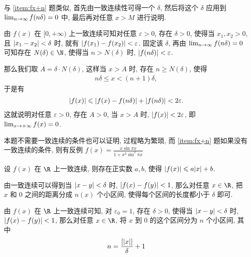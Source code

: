 \begin{exercise}[series=exer]
  \begin{hint}
      与 \ref{item:fx+n} 题类似, 首先由一致连续性可得一个 $ \delta $, 然后将这个 $ \delta $ 应用到 $ \lim_{n \to \infty} f(n\delta) = 0 $ 中, 最后再对任意 $ x > M $ 进行说明.
  \end{hint}
  \begin{answer}
      由 $ f(x) $ 在 $ [0, +\infty) $ 上一致连续可知对任意 $ \varepsilon > 0 $, 存在 $ \delta > 0 $, 使得当 $ x_{1}, x_{2} > 0 $, 且 $ \abs{x_{1} - x_{2}} < \delta $ 时, 就有 $ \abs{f(x_{1}) - f(x_{2})} < \varepsilon $. 固定该 $ \delta $, 再由 $ \lim_{n \to \infty}f(n\delta) = 0 $ 可知存在 $ N(\delta) \in \N $, 使得当 $ n > N(\delta) $ 时, $ \abs{f(n\delta)} < \varepsilon $.

      那么我们取 $ A = \delta \cdot N(\delta) $, 这样当 $ x > A $ 时, 存在 $ n \ge N(\delta) $, 使得
      \begin{align*}
          n\delta \le x < (n + 1)\delta,
      \end{align*}
      于是有
      \begin{align*}
          \abs{f(x)} \leqslant \abs{f(x) - f(n\delta)} + \abs{f(n\delta)} < 2\varepsilon.
      \end{align*}
      这就说明对任意 $ \varepsilon > 0 $, 存在 $ A > 0 $, 当 $ x > A $ 时, $ \abs{f(x)} < 2\varepsilon $, 即 $ \lim_{x \to +\infty} f(x) = 0 $.
  \end{answer}
  \begin{remark}
      本题不需要一致连续的条件也可以证明, 过程略为繁琐, 而 \ref{item:fx+n} 题如果没有一致连续的条件, 则有反例 $ f(x) = \frac{x\sin \pi x}{1 + x^{2} \sin^{2} \pi x} $
  \end{remark}
  \item\label{item:一致连续可以被控制} 设 $ f(x) $ 在 $ \R $ 上一致连续, 则存在正实数 $ a, b $, 使得 $ \abs{f(x)} \leqslant a\abs{x} + b $.
  \begin{hint}
      由一致连续可以得到当 $ \abs{x - y} < \delta $ 时, $ \abs{f(x) - f(y)} < 1 $, 那么对任意 $ x \in \R $, 把 $ x $ 和 $ 0 $ 之间的距离分成 $ n(x) $ 个小区间, 使得每个区间的长度都小于 $ \delta $ 即可.
  \end{hint}
  \begin{answer}
      由 $ f(x) $ 在 $ \R $ 上一致连续可知, 对 $ \varepsilon_{0} = 1 $, 存在 $ \delta > 0 $, 使得当 $ \abs{x - y} < \delta $ 时, $ \abs{f(x) - f(y)} < 1 $, 那么对任意 $ x \in \R $, 将 $ x $ 到 $ 0 $ 的这个区间分为 $ n $ 个小区间, 其中
      \begin{align*}
          n = \frac{[\abs{x}]}{\delta} + 1
      \end{align*}

\end{answer}
\end{exercise}
